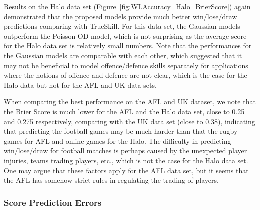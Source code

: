 Results on the Halo data set (Figure~\ref{fig:WLAccuracy_Halo_BrierScore}) again demonstrated that the proposed models provide much better win/lose/draw predictions comparing with TrueSkill. For this data set, the Gaussian models outperform the Poisson-OD model, which is not surprising as the average score for the Halo data set is relatively small numbers. Note that the performances for the Gaussian models are comparable with each other, which suggested that it may not be beneficial to model offence/defence skills separately for applications where the notions of offence and defence are not clear, which is the case for the Halo data but not for the AFL and UK data sets. 
\begin{center}
\begin{figure*}[t!]
 \centering
\caption{\small Results on the Halo data set, evaluated using the Brier Score for Win/Lose/Draw prediction. Error bars indicate
standard errors.}
\label{fig:WLAccuracy_Halo_BrierScore}
\end{figure*}
\end{center}

When comparing the best performance on the AFL and UK dataset, we note that the Brier Score is much lower for the AFL and the Halo data set, close to 0.25 and 0.275 respectively, comparing with the UK data set (close to 0.38), indicating that predicting the football games may be much harder than that the rugby games for AFL and online games for the Halo. The difficulty in predicting win/lose/draw for football matches is perhaps caused by the unexpected player injuries, teams trading players, etc., which is not the case for the Halo data set. One may argue that these factors apply for the AFL data set, but it seems that the AFL has somehow strict rules in regulating the trading of players. 


\subsubsection{Score Prediction Errors}


